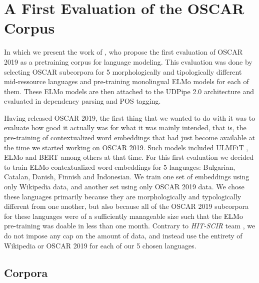 \chapter{A First Evaluation of the OSCAR Corpus}
\label{chap:monolingual}

\begin{center}
    \begin{minipage}{0.66\textwidth}
        \begin{small}
            In which we present the work of \citet{ortiz-suarez-etal-2020-monolingual}, who propose the first evaluation of OSCAR 2019 as a pretraining corpus for language modeling. This evaluation was done by selecting OSCAR subcorpora for 5 morphologically and tipologically different mid-ressource languages and pre-training monolingual ELMo models \citep{peters-etal-2018-deep} for each of them. These ELMo models are then attached to the UDPipe 2.0 architecture \citep{straka-2018-udpipe,straka-strakova-2019-evaluating} and evaluated in dependency parsing and POS tagging.
        \end{small}
    \end{minipage}
    \vspace{0.5cm}
\end{center}

Having released OSCAR 2019, the first thing that we wanted to do with it was to evaluate how good it actually was for what it was mainly intended, that is, the pre-training of contextualized word embeddings that had just become available at the time we started working on OSCAR 2019. Such models included ULMFiT \citep{howard-ruder-2018-universal}, ELMo \citep{peters-etal-2018-deep} and BERT \citep{devlin-etal-2019-bert} among others at that time. For this first evaluation we decided to train ELMo contextualized word embeddings for 5 languages: Bulgarian, Catalan, Danish, Finnish and Indonesian. We train one set of embeddings using only Wikipedia data, and another set using only OSCAR 2019 data. We chose these languages primarily because they are morphologically and typologically different from one another, but also because all of the OSCAR 2019 subcorpora for these languages were of a sufficiently manageable size such that the ELMo pre-training was doable in less than one month. Contrary to \emph{HIT-SCIR} team \citep{che-etal-2018-towards}, we do not impose any cap on the amount of data, and instead use the entirety of Wikipedia or OSCAR 2019 for each of our 5 chosen languages.

\section{Corpora}

